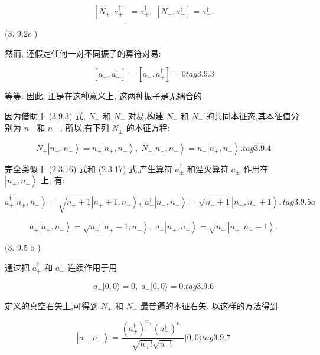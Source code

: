 $$
\left\lbrack {{N}_{ + },{a}_{ + }^{ \dagger }}\right\rbrack = {a}_{ + }^{ \dagger },\;\left\lbrack {{N}_{ - },{a}_{ - }^{ \dagger }}\right\rbrack = {a}_{ - }^{ \dagger }.
$$

(3. ${9.2c}$ )

然而, 还假定任何一对不同振子的算符对易:

$$
\left\lbrack {{a}_{ + },{a}_{ - }^{ \dagger }}\right\rbrack = \left\lbrack {{a}_{ - },{a}_{ + }^{ \dagger }}\right\rbrack = 0 tag{3.9.3}
$$

等等. 因此, 正是在这种意义上, 这两种振子是无耦合的.

因为借助于 (3.9.3) 式, ${N}_{ + }$ 和 ${N}_{ - }$ 对易,构建 ${N}_{ + }$ 和 ${N}_{ - }$ 的共同本征态,其本征值分别为 ${n}_{ + }$ 和 ${n}_{ - }$ . 所以,有下列 ${N}_{ \pm }$ 的本征方程:

$$
{N}_{ + }\left| {{n}_{ + },{n}_{ - }}\right\rangle = {n}_{ + }\left| {{n}_{ + },{n}_{ - }}\right\rangle ,\;{N}_{ - }\left| {{n}_{ + },{n}_{ - }}\right\rangle = {n}_{ - }\left| {{n}_{ + },{n}_{ - }}\right\rangle . tag{3.9.4}
$$

完全类似于 (2.3.16) 式和 (2.3.17) 式,产生算符 ${a}_{ \pm }^{ \dagger }$ 和湮灭算符 ${a}_{ \pm }$ 作用在 $\left| {{n}_{ + },{n}_{ - }}\right\rangle$ 上, 有:

$$
{a}_{ + }^{ \dagger }\left| {{n}_{ + },{n}_{ - }}\right\rangle = \sqrt{{n}_{ + } + 1}\left| {{n}_{ + } + 1,{n}_{ - }}\right\rangle ,\;{a}_{ - }^{ \dagger }\left| {{n}_{ + },{n}_{ - }}\right\rangle = \sqrt{{n}_{ - } + 1}\left| {{n}_{ + },{n}_{ - } + 1}\right\rangle , tag{3.9.5a}
$$

$$
{a}_{ + }\left| {{n}_{ + },{n}_{ - }}\right\rangle = \sqrt{{n}_{ + }}\left| {{n}_{ + } - 1,{n}_{ - }}\right\rangle ,\;{a}_{ - }\left| {{n}_{ + },{n}_{ - }}\right\rangle = \sqrt{{n}_{ - }}\left| {{n}_{ + },{n}_{ - } - 1}\right\rangle .
$$

(3. ${9.5}\mathrm{\;b}$ )

通过把 ${a}_{ + }^{ \dagger }$ 和 ${a}_{ - }^{ \dagger }$ 连续作用于用

$$
{a}_{ + }\left| {0,0\rangle = 0,\;{a}_{ - }}\right| 0,0\rangle = 0. tag{3. 9.6}
$$

定义的真空右矢上,可得到 ${N}_{ + }$ 和 ${N}_{ - }$ 最普遍的本征右矢. 以这样的方法得到

$$
\left| {{n}_{ + },{n}_{ - }}\right\rangle = \frac{{\left( {a}_{ + }^{ \dagger }\right) }^{{n}_{ + }}{\left( {a}_{ - }^{ \dagger }\right) }^{{n}_{ - }}}{\sqrt{{n}_{ + }!}\sqrt{{n}_{ - }!}}|0,0\rangle tag{3.9.7}
$$

